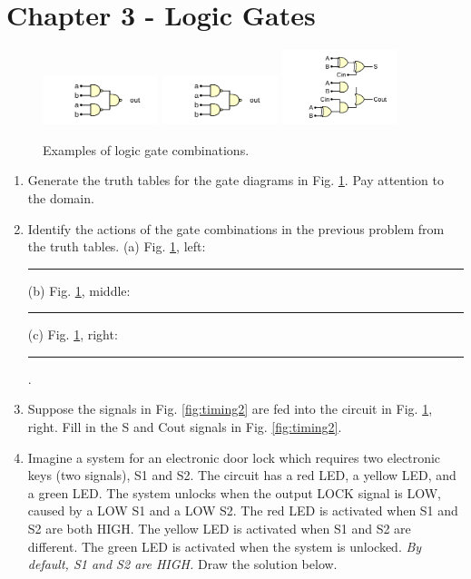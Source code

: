 \documentclass[10pt]{article}
\begin{document}
\section{Chapter 3 - Logic Gates}
\begin{figure}[ht]
\centering
\includegraphics[width=0.3\textwidth]{gateExample1.pdf}
\includegraphics[width=0.3\textwidth]{gateExample2.pdf}
\includegraphics[width=0.3\textwidth]{gateExample3.pdf}
\caption{\label{fig:gates1} Examples of logic gate combinations.}
\end{figure}
\begin{enumerate}
\item Generate the truth tables for the gate diagrams in Fig. \ref{fig:gates1}. Pay attention to the domain.  \\ \vspace{3cm}
\item Identify the actions of the gate combinations in the previous problem from the truth tables.  (a) Fig. \ref{fig:gates1}, left:\rule{3cm}{0.1mm} (b) Fig. \ref{fig:gates1}, middle:\rule{3cm}{0.1mm} (c) Fig. \ref{fig:gates1}, right:\rule{3cm}{0.1mm}.
\item Suppose the signals in Fig. \ref{fig:timing2} are fed into the circuit in Fig. \ref{fig:gates1}, right.  Fill in the S and Cout signals in Fig. \ref{fig:timing2}.
\item Imagine a system for an electronic door lock which requires two electronic keys (two signals), S1 and S2.  The circuit has a red LED, a yellow LED, and a green LED.  The system unlocks when the output LOCK signal is LOW, caused by a LOW S1 and a LOW S2.  The red LED is activated when S1 and S2 are both HIGH.  The yellow LED is activated when S1 and S2 are different.  The green LED is activated when the system is unlocked.  \textit{By default, S1 and S2 are HIGH.} Draw the solution below.  \\ \vspace{4cm}
\end{enumerate}
\end{document}
